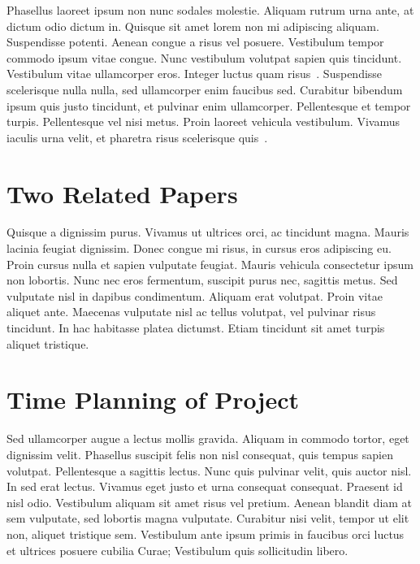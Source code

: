 \documentclass[10pt, conference]{IEEEtran}
\begin{document}
Phasellus laoreet ipsum non nunc sodales molestie. Aliquam rutrum urna ante, at dictum odio dictum in. Quisque sit amet lorem non mi adipiscing aliquam. Suspendisse potenti. Aenean congue a risus vel posuere. Vestibulum tempor commodo ipsum vitae congue. Nunc vestibulum volutpat sapien quis tincidunt. Vestibulum vitae ullamcorper eros. Integer luctus quam risus~\cite{humble10}. Suspendisse scelerisque nulla nulla, sed ullamcorper enim faucibus sed. Curabitur bibendum ipsum quis justo tincidunt, et pulvinar enim ullamcorper. Pellentesque et tempor turpis. Pellentesque vel nisi metus. Proin laoreet vehicula vestibulum. Vivamus iaculis urna velit, et pharetra risus scelerisque quis~\cite{baysal11}.

\section{Two Related Papers}
\label{sec:two-related-papers}

Quisque a dignissim purus. Vivamus ut ultrices orci, ac tincidunt magna. Mauris lacinia feugiat dignissim. Donec congue mi risus, in cursus eros adipiscing eu. Proin cursus nulla et sapien vulputate feugiat. Mauris vehicula consectetur ipsum non lobortis. Nunc nec eros fermentum, suscipit purus nec, sagittis metus. Sed vulputate nisl in dapibus condimentum. Aliquam erat volutpat. Proin vitae aliquet ante. Maecenas vulputate nisl ac tellus volutpat, vel pulvinar risus tincidunt. In hac habitasse platea dictumst. Etiam tincidunt sit amet turpis aliquet tristique.

\section{Time Planning of Project}
\label{sec:schedule}

Sed ullamcorper augue a lectus mollis gravida. Aliquam in commodo tortor, eget dignissim velit. Phasellus suscipit felis non nisl consequat, quis tempus sapien volutpat. Pellentesque a sagittis lectus. Nunc quis pulvinar velit, quis auctor nisl. In sed erat lectus. Vivamus eget justo et urna consequat consequat. Praesent id nisl odio. Vestibulum aliquam sit amet risus vel pretium. Aenean blandit diam at sem vulputate, sed lobortis magna vulputate. Curabitur nisi velit, tempor ut elit non, aliquet tristique sem. Vestibulum ante ipsum primis in faucibus orci luctus et ultrices posuere cubilia Curae; Vestibulum quis sollicitudin libero.

\balance


\end{document}
